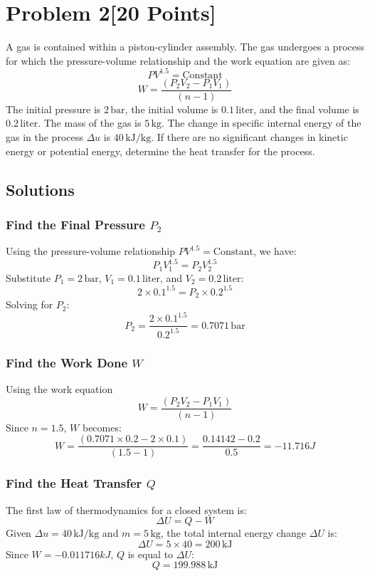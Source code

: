 \documentclass{article}
\begin{document}
\section*{Problem 2[20 Points]}
A gas is contained within a piston-cylinder assembly. The gas undergoes a process for which the pressure-volume relationship and the work equation are given as:
\[
PV^{1.5} = \text{Constant}
\]
\[
W = \frac{(P_2V_2 - P_1V_1)}{(n-1)}
\]
The initial pressure is \(2 \, \text{bar}\), the initial volume is \(0.1 \, \text{liter}\), and the final volume is \(0.2 \, \text{liter}\). The mass of the gas is \(5 \, \text{kg}\). The change in specific internal energy of the gas in the process \(\Delta u\) is \(40 \, \text{kJ/kg}\). If there are no significant changes in kinetic energy or potential energy, determine the heat transfer for the process.

\subsection*{Solutions}

\subsubsection*{Find the Final Pressure \(P_2\)}
Using the pressure-volume relationship \(PV^{1.5} = \text{Constant}\), we have:
\[
P_1V_1^{1.5} = P_2V_2^{1.5}
\]
Substitute \(P_1 = 2 \, \text{bar}\), \(V_1 = 0.1 \, \text{liter}\), and \(V_2 = 0.2 \, \text{liter}\):
\[
2 \times 0.1^{1.5} = P_2 \times 0.2^{1.5}
\]
Solving for \(P_2\):
\[
P_2 = \frac{2 \times 0.1^{1.5}}{0.2^{1.5}} = 0.7071 \, \text{bar}
\]

\subsubsection*{Find the Work Done \(W\)}
Using the work equation
\[
W = \frac{(P_2V_2 - P_1V_1)}{(n-1)}
\]
Since \(n = 1.5\), \(W\) becomes:
\[
W = \frac{(0.7071 \times 0.2 - 2 \times 0.1)}{(1.5-1)} = \frac{0.14142 - 0.2}{0.5} = -11.716 J
\]

\subsubsection*{Find the Heat Transfer \(Q\)}
The first law of thermodynamics for a closed system is:
\[
\Delta U = Q - W
\]
Given \(\Delta u = 40 \, \text{kJ/kg}\) and \(m = 5 \, \text{kg}\), the total internal energy change \(\Delta U\) is:
\[
\Delta U = 5 \times 40 = 200 \, \text{kJ}
\]
Since \(W = -0.011716 kJ\), \(Q\) is equal to \(\Delta U\):
\[
Q = 199.988 \, \text{kJ}
\]
\newpage
\end{document}

